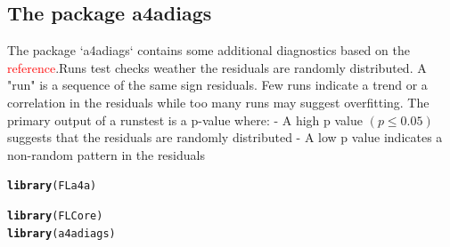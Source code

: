 \documentclass{article}\usepackage[]{graphicx}\usepackage[]{xcolor}
\makeatletter
\newcommand{\hldef}[1]{\textcolor[rgb]{0.345,0.345,0.345}{#1}}%
\newcommand{\hlkwd}[1]{\textcolor[rgb]{0.737,0.353,0.396}{\textbf{#1}}}%
\newenvironment{kframe}{%
 \def\at@end@of@kframe{}%
 \ifinner\ifhmode%
  \def\at@end@of@kframe{\end{minipage}}%
  \begin{minipage}{\columnwidth}%
 \fi\fi%
 \def\FrameCommand##1{\hskip\@totalleftmargin \hskip-\fboxsep
 \colorbox{shadecolor}{##1}\hskip-\fboxsep
     \hskip-\linewidth \hskip-\@totalleftmargin \hskip\columnwidth}%
 \MakeFramed {\advance\hsize-\width
   \@totalleftmargin\z@ \linewidth\hsize
   \@setminipage}}%
 {\par\unskip\endMakeFramed%
 \at@end@of@kframe}
\newenvironment{knitrout}{}{} %
\makeatother
\begin{document}
\subsection{The package a4adiags}

The package `a4adiags` contains some additional diagnostics based on the \textcolor{red}{reference}.Runs test checks weather the residuals are randomly distributed. A "run" is a sequence of the same sign residuals. Few runs indicate a trend or a correlation in the residuals while too many runs may suggest overfitting. 
  The primary output of a runstest is a p-value where:
    - A high p value $(p\leq 0.05)$ suggests that the residuals are randomly distributed
    - A low p value indicates a non-random pattern in the residuals

\begin{knitrout}
\color{fgcolor}\begin{kframe}
\begin{alltt}
\hlkwd{library}\hldef{(FLa4a)}
\end{alltt}


{\ttfamily\noindent\itshape\color{messagecolor}{\#\# Loading required package: FLCore}}

{\ttfamily\noindent\itshape\color{messagecolor}{\#\# Loading required package: lattice}}

{\ttfamily\noindent\itshape\color{messagecolor}{\#\# Loading required package: iterators}}

{\ttfamily\noindent\itshape\color{messagecolor}{\#\# FLCore (Version 2.6.20.9201, packaged: 2024-07-08 21:29:30 UTC)}}

{\ttfamily\noindent\itshape\color{messagecolor}{\#\# Loading required package: triangle}}

{\ttfamily\noindent\itshape{}}\begin{alltt}
\hlkwd{library}\hldef{(FLCore)}
\hlkwd{library}\hldef{(a4adiags)}
\end{alltt}


{\ttfamily\noindent\itshape\color{messagecolor}{\#\# Loading required package: ggplot2}}

{\ttfamily\noindent\itshape\color{messagecolor}{\#\# \\\#\# Attaching package: 'ggplot2'}}

{\ttfamily\noindent\itshape\color{messagecolor}{\#\# The following object is masked from 'package:FLCore':\\\#\# \\\#\# \ \ \ \ \%+\%}}


\end{kframe}
\end{knitrout}
\end{document}
